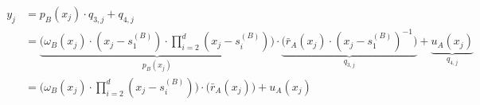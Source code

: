 \begin{align}\label{equation:OPA}
\begin{split}
y_{\scriptscriptstyle j}&=p_{\scriptscriptstyle B}(x_{\scriptscriptstyle j})\cdot q_{\scriptscriptstyle 3,j}+q_{\scriptscriptstyle 4,j}\\
&= \underbrace{\Big(\omega_{\scriptscriptstyle B}(x_{\scriptscriptstyle j})\cdot (x_{\scriptscriptstyle j}-s^{\scriptscriptstyle(B)}_{\scriptscriptstyle 1})\cdot \prod\limits^{\scriptscriptstyle d}_{\scriptscriptstyle i=2}(x_{\scriptscriptstyle j}-s^{\scriptscriptstyle(B)}_{\scriptscriptstyle i})\Big)}_{p_{\scriptscriptstyle B}(x_{\scriptscriptstyle j})}\cdot \underbrace{\Big(\bar{r}_{\scriptscriptstyle A}(x_{\scriptscriptstyle j})\cdot (x_{\scriptscriptstyle j}-s^{\scriptscriptstyle(B)}_{\scriptscriptstyle 1})^{\scriptscriptstyle -1}\Big)}_{ q_{\scriptscriptstyle 3,j}}+\underbrace{u_{\scriptscriptstyle A}(x_{\scriptscriptstyle j})}_{q_{\scriptscriptstyle 4,j}}\\
&= {\Big(\omega_{\scriptscriptstyle B}(x_{\scriptscriptstyle j})\cdot \prod\limits^{\scriptscriptstyle d}_{\scriptscriptstyle i=2}(x_{\scriptscriptstyle j}-s^{\scriptscriptstyle(B)}_{\scriptscriptstyle i})\Big)}\cdot \Big(\bar{r}_{\scriptscriptstyle A}(x_{\scriptscriptstyle j})\Big)+u_{\scriptscriptstyle A}(x_{\scriptscriptstyle j})\\
\end{split}
\end{align}


\


\

%



